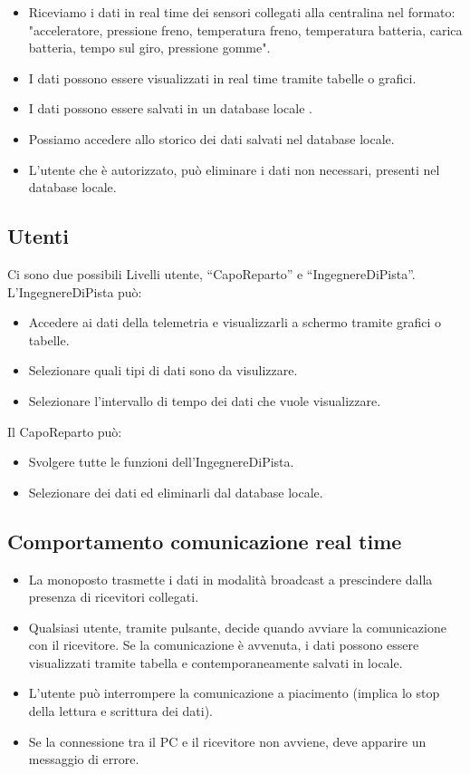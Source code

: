 \documentclass{report}
\begin{document}
\begin{itemize}
\item Riceviamo i dati in real time dei sensori collegati alla centralina nel formato: "acceleratore, pressione freno, temperatura freno, temperatura batteria, carica batteria, tempo sul giro, pressione gomme".
\item I dati possono essere visualizzati in real time tramite tabelle o grafici.
\item I dati possono essere salvati in un database locale .
\item Possiamo accedere allo storico dei dati salvati nel database locale.
\item L'utente che è autorizzato, può eliminare i dati non necessari, presenti nel database locale.
\end{itemize}


\subsection{Utenti}
Ci sono due possibili Livelli utente, “CapoReparto” e “IngegnereDiPista”.\\

L'IngegnereDiPista può:\\
\begin{itemize}
\item Accedere ai dati della telemetria e visualizzarli a schermo tramite grafici o tabelle.
\item Selezionare quali tipi di dati sono da visulizzare.
\item Selezionare l’intervallo di tempo dei dati che vuole visualizzare.\\
\end{itemize}

Il CapoReparto può:
\begin{itemize}
\item Svolgere tutte le funzioni dell’IngegnereDiPista.
\item Selezionare dei dati ed eliminarli dal database locale.
\end{itemize}

\subsection{Comportamento comunicazione real time}
\begin{itemize}
\item La monoposto trasmette i dati in modalità broadcast a prescindere dalla presenza di ricevitori collegati.
\item Qualsiasi utente, tramite pulsante, decide quando avviare la comunicazione con il ricevitore.
Se la comunicazione è avvenuta, i dati possono essere visualizzati tramite tabella e contemporaneamente salvati in locale.
\item L’utente può interrompere la comunicazione a piacimento (implica lo stop della lettura e scrittura dei dati).
\item Se la connessione tra il PC e il ricevitore non avviene, deve apparire un messaggio di errore.
\end{itemize}
\end{document}
